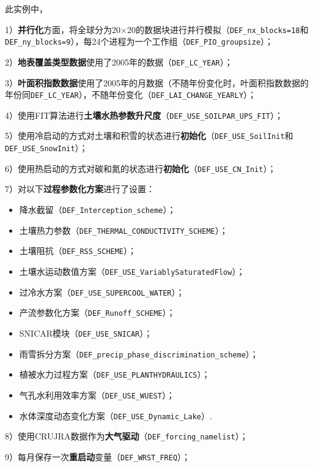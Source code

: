 此实例中，\par
1）\textbf{并行化}方面，将全球分为20\textdegree$\times$20\textdegree 的数据块进行并行模拟（\texttt{DEF\_nx\_blocks=18}和\texttt{DEF\_ny\_blocks=9}），每24个进程为一个工作组（\texttt{DEF\_PIO\_groupsize}）；\par
2）\textbf{地表覆盖类型数据}使用了2005年的数据（\texttt{DEF\_LC\_YEAR}）；\par
3）\textbf{叶面积指数数据}使用了2005年的月数据（不随年份变化时，叶面积指数数据的年份同\texttt{DEF\_LC\_YEAR}），不随年份变化（\texttt{DEF\_LAI\_CHANGE\_YEARLY}）；\par
4）使用FIT算法进行\textbf{土壤水热参数升尺度}（\texttt{DEF\_USE\_SOILPAR\_UPS\_FIT}）；\par
5）使用冷启动的方式对土壤和积雪的状态进行\textbf{初始化}（\texttt{DEF\_USE\_SoilInit}和\texttt{DEF\_\allowbreak USE\_\allowbreak SnowInit}）；\par
6）使用热启动的方式对碳和氮的状态进行\textbf{初始化}（\texttt{DEF\_USE\_CN\_Init}）；\par
7）对以下\textbf{过程参数化方案}进行了设置：
\begin{itemize}[nosep,leftmargin=4em]
    \item 降水截留（\texttt{DEF\_Interception\_scheme}）；
    \item 土壤热力参数（\texttt{DEF\_THERMAL\_CONDUCTIVITY\_SCHEME}）；
    \item 土壤阻抗（\texttt{DEF\_RSS\_SCHEME}）；
    \item 土壤水运动数值方案（\texttt{DEF\_USE\_VariablySaturatedFlow}）；
    \item 过冷水方案（\texttt{DEF\_USE\_SUPERCOOL\_WATER}）；
    \item 产流参数化方案（\texttt{DEF\_Runoff\_SCHEME}）；
    \item SNICAR模块（\texttt{DEF\_USE\_SNICAR}）；
    \item 雨雪拆分方案（\texttt{DEF\_precip\_phase\_discrimination\_scheme}）；
    \item 植被水力过程方案（\texttt{DEF\_USE\_PLANTHYDRAULICS}）；
    \item 气孔水利用效率方案（\texttt{DEF\_USE\_WUEST}）；
    \item 水体深度动态变化方案（\texttt{DEF\_USE\_Dynamic\_Lake}）.
\end{itemize}
\par
8）使用CRUJRA数据作为\textbf{大气驱动}（\texttt{DEF\_forcing\_namelist}）；\par
9）每月保存一次\textbf{重启动}变量（\texttt{DEF\_WRST\_FREQ}）；\par
